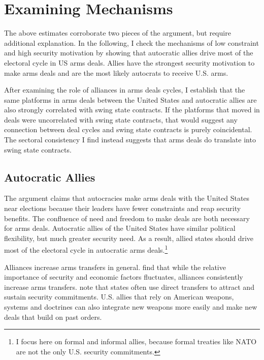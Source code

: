 \documentclass[12pt]{article}
\begin{document}
\section{Examining Mechanisms}


The above estimates corroborate two pieces of the argument, but require additional explanation. 
In the following, I check the mechanisms of low constraint and high security motivation by showing that autocratic allies drive most of the electoral cycle in US arms deals.  
Allies have the strongest security motivation to make arms deals and are the most likely autocrats to receive U.S. arms. 

After examining the role of alliances in arms deals cycles, I establish that the same platforms in arms deals between the United States and autocratic allies are also strongly correlated with swing state contracts.
If the platforms that moved in deals were uncorrelated with swing state contracts, that would suggest any connection between deal cycles and swing state contracts is purely coincidental.
The sectoral consistency I find instead suggests that arms deals do translate into swing state contracts. 



\subsection{Autocratic Allies}


The argument claims that autocracies make arms deals with the United States near elections because their leaders have fewer constraints and reap security benefits. 
The confluence of need and freedom to make deals are both necessary for arms deals. 
Autocratic allies of the United States have similar political flexibility, but much greater security need. 
As a result, allied states should drive most of the electoral cycle in autocratic arms deals.\footnote{I focus here on formal and informal allies, because formal treaties like NATO are not the only U.S. security commitments.}


Alliances increase arms transfers in general. 
\citet{Thurneretal2019} find that while the relative importance of security and economic factors fluctuates, alliances consistently increase arms transfers.
\citet[pg. 184-5]{IkenberryGrieco2003} note that states often use direct transfers to attract and sustain security commitments. 
U.S. allies that rely on American weapons, systems and doctrines can also integrate new weapons more easily and make new deals that build on past orders. 
\end{document}
